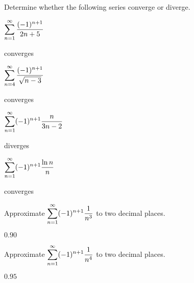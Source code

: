 \begin{exercises}

Determine whether the following series converge or diverge.

\twocol

\begin{exercise} $\displaystyle\sum_{n=1}^\infty {(-1)^{n+1}\over 2n+5}$
\begin{answer} converges
\end{answer}\end{exercise}

\begin{exercise} $\displaystyle\sum_{n=4}^\infty {(-1)^{n+1}\over \sqrt{n-3}}$
\begin{answer} converges
\end{answer}\end{exercise}

\begin{exercise} $\displaystyle\sum_{n=1}^\infty (-1)^{n+1}{n\over 3n-2}$
\begin{answer} diverges
\end{answer}\end{exercise}

\begin{exercise} $\displaystyle\sum_{n=1}^\infty (-1)^{n+1}{\ln n\over n}$
\begin{answer} converges
\end{answer}\end{exercise}
\endtwocol

\begin{exercise} Approximate $\displaystyle\sum_{n=1}^\infty (-1)^{n+1}{1\over n^3}$ to
two decimal places.
\begin{answer} $0.90$
\end{answer}\end{exercise}

\begin{exercise} Approximate $\displaystyle\sum_{n=1}^\infty (-1)^{n+1}{1\over n^4}$ to
two decimal places. 
\begin{answer} $0.95$
\end{answer}\end{exercise}

\end{exercises}

